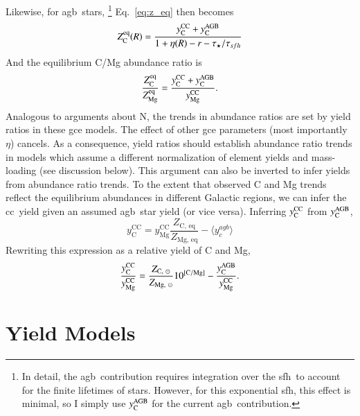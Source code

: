 \documentclass[12pt,oneside,letterpaper]{report}
\newcommand{\cc}{\gls{cc}}
\newcommand{\agb}{\gls{agb}}
\newcommand{\sfh}{\gls{sfh}}
\newcommand{\gce}{\gls{gce}}
\newcommand{\Ycc}{\ensuremath{y_{\rm C}^{\rm CC}}}
\newcommand{\Yoc}{\ensuremath{y_{\rm Mg}^{\rm CC}}}
\newcommand{\Ycagb}{\ensuremath{y_{\rm C}^{\rm AGB}}}
\begin{document}
Likewise, for \agb\ stars,
\footnote{In detail, the \agb\ contribution requires integration over the \sfh\ to account for the finite lifetimes of stars. However, for this exponential \sfh, this effect is minimal, so I simply use $\Ycagb$ for the current \agb\ contribution.}
Eq.~\ref{eq:z_eq} then becomes
\begin{equation}
    Z_{\rm C}^{\rm eq}(R) = \frac{\Ycc + \Ycagb}{1 + \eta(R) - r - \tau_\star / \tau_{sfh}}
\end{equation}
And the equilibrium C/Mg abundance ratio is
\begin{equation}\label{eq:z_co}
    \frac{Z_{\rm C}^{\rm eq}}{Z_{\rm Mg}^{\rm eq}} = \frac{\Ycc + \Ycagb }{\Yoc}.
\end{equation}
Analogous to \cite{james+23} arguments about N, the trends in abundance ratios are set by yield ratios in these \gce{} models. The effect of other \gce{} parameters (most importantly $\eta$) cancels. As a consequence, yield ratios should establish abundance ratio trends in models which assume a different normalization of element yields and mass-loading (see discussion below).
This argument can also be inverted to infer  yields from abundance ratio trends. To the extent that observed C and Mg trends reflect the equilibrium abundances in different Galactic regions, we can infer the \cc\ yield given an assumed \agb\ star yield (or vice versa). Inferring $\Ycc$ from $\Ycagb$, 
\begin{equation}
    y_\text{C}^\text{CC} =  y_\text{Mg}^\text{CC} \frac{Z_\text{C,~eq}}{Z_\text{Mg,~eq}} - \langle y_c^{agb} \rangle
\end{equation}
Rewriting this expression as a relative yield of C and Mg,
\begin{equation}\label{eq:y_c_eq}
    \frac{\Ycc}{\Yoc} = \frac{Z_{\text{C},~\odot}}{Z_{\text{Mg},~\odot}} 10^{\rm [C/Mg]} - \frac{\Ycagb}{\Yoc}.
\end{equation}

\section{Yield Models}
\end{document}
